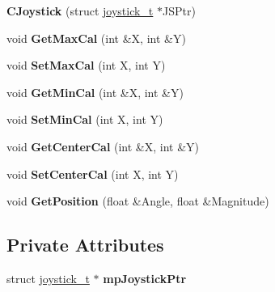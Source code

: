 \begin{DoxyCompactItemize}
\item 
\hypertarget{class_c_joystick_ac40fc080d7fdab0f611fbad6983e32aa}{{\bfseries C\-Joystick} (struct \hyperlink{structjoystick__t}{joystick\-\_\-t} $\ast$J\-S\-Ptr)}\label{class_c_joystick_ac40fc080d7fdab0f611fbad6983e32aa}

\item 
\hypertarget{class_c_joystick_ab07e2ed3efce57ac9f8cf5853fedc287}{void {\bfseries Get\-Max\-Cal} (int \&X, int \&Y)}\label{class_c_joystick_ab07e2ed3efce57ac9f8cf5853fedc287}

\item 
\hypertarget{class_c_joystick_a6bc1041343ac3288417e5bf9e294d11d}{void {\bfseries Set\-Max\-Cal} (int X, int Y)}\label{class_c_joystick_a6bc1041343ac3288417e5bf9e294d11d}

\item 
\hypertarget{class_c_joystick_a9e7bbaec40c366b16cef47122ea1ceee}{void {\bfseries Get\-Min\-Cal} (int \&X, int \&Y)}\label{class_c_joystick_a9e7bbaec40c366b16cef47122ea1ceee}

\item 
\hypertarget{class_c_joystick_ac998c18a4dbe864a6ef8dbbd5d79daf7}{void {\bfseries Set\-Min\-Cal} (int X, int Y)}\label{class_c_joystick_ac998c18a4dbe864a6ef8dbbd5d79daf7}

\item 
\hypertarget{class_c_joystick_a9ea66778e4a19e37fd65bc687ecf0feb}{void {\bfseries Get\-Center\-Cal} (int \&X, int \&Y)}\label{class_c_joystick_a9ea66778e4a19e37fd65bc687ecf0feb}

\item 
\hypertarget{class_c_joystick_a3df39a46fa98afb7b39d305b0ae35740}{void {\bfseries Set\-Center\-Cal} (int X, int Y)}\label{class_c_joystick_a3df39a46fa98afb7b39d305b0ae35740}

\item 
\hypertarget{class_c_joystick_a176ae8bbc5e4253845eb3257884f302a}{void {\bfseries Get\-Position} (float \&Angle, float \&Magnitude)}\label{class_c_joystick_a176ae8bbc5e4253845eb3257884f302a}

\end{DoxyCompactItemize}
\subsection*{Private Attributes}
\begin{DoxyCompactItemize}
\item 
\hypertarget{class_c_joystick_abff513cf316a9dbbfdab0c13436b1e6e}{struct \hyperlink{structjoystick__t}{joystick\-\_\-t} $\ast$ {\bfseries mp\-Joystick\-Ptr}}\label{class_c_joystick_abff513cf316a9dbbfdab0c13436b1e6e}

\end{DoxyCompactItemize}



